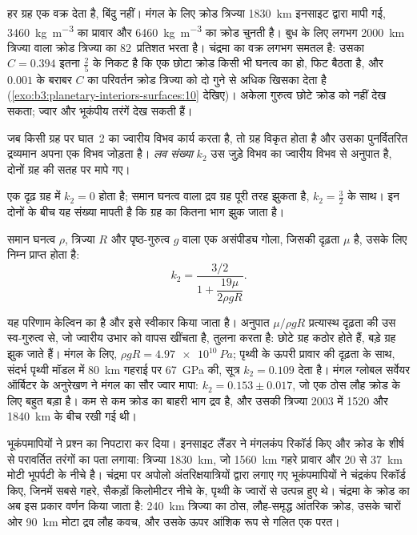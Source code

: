 हर ग्रह एक वक्र देता है, बिंदु नहीं। मंगल के लिए क्रोड त्रिज्या
\qty{1830}{km} इनसाइट द्वारा मापी गई, \qty{3460}{kg.m^{-3}} का प्रावार
और \qty{6460}{kg.m^{-3}} का क्रोड चुनती है। बुध के लिए लगभग
\qty{2000}{km} त्रिज्या वाला क्रोड त्रिज्या का 82~प्रतिशत भरता है। चंद्रमा का वक्र
लगभग समतल है: उसका $C = 0.394$ इतना $\tfrac25$ के निकट है कि एक छोटा क्रोड
किसी भी घनत्व का हो, फिट बैठता है, और $0.001$ के बराबर $C$ का परिवर्तन क्रोड त्रिज्या को
दो गुने से अधिक खिसका देता है (\cref{exo:b3:planetary-interiors-surfaces:10} देखिए)।
अकेला गुरुत्व छोटे क्रोड को नहीं देख सकता; ज्वार और भूकंपीय तरंगें देख सकती हैं।

\begin{definition}[लव संख्या]\label{def:b3:planetary-interiors-surfaces:love-number}
जब किसी ग्रह पर घात~2 का ज्वारीय विभव कार्य करता है, तो ग्रह विकृत होता है और
उसका पुनर्वितरित द्रव्यमान अपना एक विभव जोड़ता है। \emph{लव
संख्या} $k_2$ उस जुड़े विभव का ज्वारीय विभव से अनुपात है,
दोनों ग्रह की सतह पर मापे गए।
\end{definition}

एक दृढ़ ग्रह में $k_2 = 0$ होता है; समान घनत्व वाला द्रव ग्रह
पूरी तरह झुकता है, $k_2 = \tfrac32$ के साथ। इन दोनों के बीच यह संख्या मापती है कि
ग्रह का कितना भाग झुक जाता है।

\begin{proposition}[समान प्रत्यास्थ गोले की लव संख्या]\label{prop:b3:planetary-interiors-surfaces:kelvin}
समान घनत्व $\rho$, त्रिज्या $R$ और पृष्ठ-गुरुत्व $g$ वाला एक असंपीड्य गोला,
जिसकी दृढ़ता $\mu$ है, उसके लिए निम्न प्राप्त होता है:
\[
  k_2 = \frac{3/2}{1 + \dfrac{19\mu}{2\rho g R}} .
\]
\end{proposition}

यह परिणाम केल्विन का है और इसे स्वीकार किया जाता है। अनुपात $\mu/\rho gR$ प्रत्यास्थ दृढ़ता की
उस स्व-गुरुत्व से, जो ज्वारीय उभार को वापस खींचता है,
तुलना करता है: छोटे ग्रह कठोर होते हैं, बड़े ग्रह झुक जाते हैं। मंगल के लिए, $\rho gR =
\qty{4.97e10}{Pa}$; पृथ्वी के ऊपरी प्रावार की दृढ़ता के साथ,
संदर्भ पृथ्वी मॉडल में \qty{80}{km} गहराई पर \qty{67}{GPa} की, सूत्र
$k_2 = 0.109$ देता है। मंगल ग्लोबल सर्वेयर ऑर्बिटर के अनुरेखण ने
मंगल का सौर ज्वार मापा: $k_2 = 0.153 \pm 0.017$, जो
एक ठोस लौह क्रोड के लिए बहुत बड़ा है। कम से कम क्रोड का बाहरी भाग
द्रव है, और उसकी त्रिज्या 2003 में 1520 और \qty{1840}{km} के बीच रखी गई थी।

भूकंपमापियों ने प्रश्न का निपटारा कर दिया। इनसाइट लैंडर ने
मंगलकंप रिकॉर्ड किए और क्रोड के शीर्ष से परावर्तित तरंगों का पता लगाया: त्रिज्या
\qty{1830}{km}, जो \qty{1560}{km} गहरे प्रावार और 20 से
\qty{37}{km} मोटी भूपर्पटी के नीचे है। चंद्रमा पर अपोलो अंतरिक्षयात्रियों द्वारा
लगाए गए भूकंपमापियों ने चंद्रकंप रिकॉर्ड किए, जिनमें सबसे गहरे, सैकड़ों
किलोमीटर नीचे के, पृथ्वी के ज्वारों से उत्पन्न हुए थे। चंद्रमा के क्रोड का अब
इस प्रकार वर्णन किया जाता है: \qty{240}{km} त्रिज्या का ठोस, लौह-समृद्ध आंतरिक क्रोड,
उसके चारों ओर \qty{90}{km} मोटा द्रव लौह कवच,
और उसके ऊपर आंशिक रूप से गलित एक परत।


